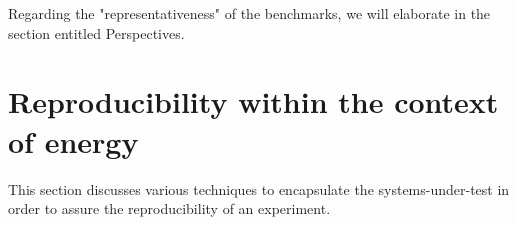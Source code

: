 Regarding the "representativeness" of the benchmarks, we will elaborate in the section entitled Perspectives.









\section{Reproducibility within the context of energy}\label{sec:benchmarking_reproducibility}
This section discusses various techniques to encapsulate the systems-under-test in order to assure the reproducibility of an experiment.

